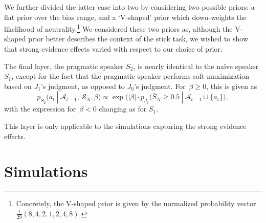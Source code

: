 \documentclass[10pt,letterpaper]{article}
\begin{document}
We further divided the latter case into two by considering two possible priors: a flat prior over the bias range, and a `V-shaped' prior which down-weights 
the likelihood of neutrality.\footnote{Concretely, the V-shaped prior is given by the normalized probability vector $\frac{1}{29} (8, 4, 2, 1, 2, 4, 8)$.} 
We considered these two priors as, although the V-shaped prior better describes the context of the stick task, we wished to show 
that strong evidence effects varied with respect to our choice of prior.

The final layer, the pragmatic speaker $S_2$, is nearly identical to the na\"ive speaker $S_1$, except for the fact that
the pragmatic speaker performs soft-maximization based on $J_1$'s judgment, as opposed to $J_0$'s judgment. For~${\beta\ge0}$,
this is given as
\begin{equation}
	p_{S_2} (a_t \ | \ \mathcal{A}_{t-1},\ \mathcal{S}_N, \beta) \propto \exp \bigl(\lvert\beta\rvert  \cdot p_{J_1} (\bar{S}_N \ge 0.5 \ | \ \mathcal{A}_{t-1} \cup \{a_t\} \bigr),
\end{equation}
with the expression for~${\beta<0}$ changing as for $S_1$.

This layer is only applicable to the simulations capturing the strong evidence effects.

\section{Simulations}
\end{document}
